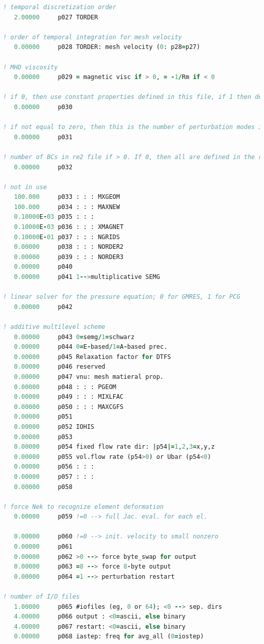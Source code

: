 \documentclass[10pt]{article}
\numberwithin{equation}{section} %
\begin{document}
\begin{itemize}
\begin{lstlisting}[language=Fortran]
! temporal discretization order
   2.00000     p027 TORDER

! order of temporal integration for mesh velocity
   0.00000     p028 TORDER: mesh velocity (0: p28=p27)
   
! MHD viscosity
   0.00000     p029 = magnetic visc if > 0, = -1/Rm if < 0
   
! if 0, then use constant properties defined in this file, if 1 then define each scalar separately, and if 2 then set all scalars at once in the USERVP subroutine. If using the uservp() routine, then the ifuservp boolean variable is set to true.
   0.00000     p030

! if not equal to zero, then this is the number of perturbation modes in linearized N-S
   0.00000     p031

! number of BCs in re2 file if > 0. If 0, then all are defined in the re2 file
   0.00000     p032
   
! not in use
   100.000     p033 : : : MXGEOM
   100.000     p034 : : : MAXNEW
   0.10000E-03 p035 : : :
   0.10000E-03 p036 : : : XMAGNET
   0.10000E-01 p037 : : : NGRIDS
   0.00000     p038 : : : NORDER2
   0.00000     p039 : : : NORDER3
   0.00000     p040
   0.00000     p041 1-->multiplicative SEMG

! linear solver for the pressure equation; 0 for GMRES, 1 for PCG
   0.00000     p042
   
! additive multilevel scheme
   0.00000     p043 0=semg/1=schwarz
   0.00000     p044 0=E-based/1=A-based prec.
   0.00000     p045 Relaxation factor for DTFS
   0.00000     p046 reserved
   0.00000     p047 vnu: mesh matieral prop.
   0.00000     p048 : : : PGEOM
   0.00000     p049 : : : MIXLFAC
   0.00000     p050 : : : MAXCGFS
   0.00000     p051
   0.00000     p052 IOHIS
   0.00000     p053
   0.00000     p054 fixed flow rate dir: |p54|=1,2,3=x,y,z
   0.00000     p055 vol.flow rate (p54>0) or Ubar (p54<0)
   0.00000     p056 : : :
   0.00000     p057 : : :
   0.00000     p058

! force Nek to recognize element deformation
   0.00000     p059 !=0 --> full Jac. eval. for each el.
   
   0.00000     p060 !=0 --> init. velocity to small nonzero
   0.00000     p061
   0.00000     p062 >0 --> force byte_swap for output
   0.00000     p063 =8 --> force 8-byte output
   0.00000     p064 =1 --> perturbation restart

! number of I/O files
   1.00000     p065 #iofiles (eg, 0 or 64); <0 --> sep. dirs
   4.00000     p066 output : <0=ascii, else binary
   4.00000     p067 restart: <0=ascii, else binary
   0.00000     p068 iastep: freq for avg_all (0=iostep)


\end{lstlisting}
\end{itemize}
\end{document}
